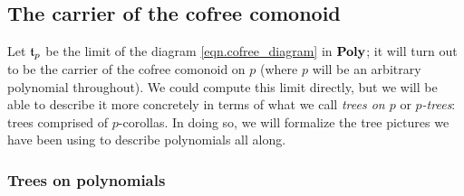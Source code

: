 \documentclass[Book-Poly]{subfiles}
\begin{document}
\subsection{The carrier of the cofree comonoid} \label{subsec.comon.cofree.cons.car}

Let $\mathfrak{t}_p$ be the limit of the diagram \eqref{eqn.cofree_diagram} in $\mathbf{Poly}$; it will turn out to be the carrier of the cofree comonoid on $p$ (where $p$ will be an arbitrary polynomial throughout).
We could compute this limit directly, but we will be able to describe it more concretely in terms of what we call \emph{trees on $p$} or \emph{$p$-trees}: trees comprised of $p$-corollas.
In doing so, we will formalize the tree pictures we have been using to describe polynomials all along.

\subsubsection{Trees on polynomials}
\end{document}
